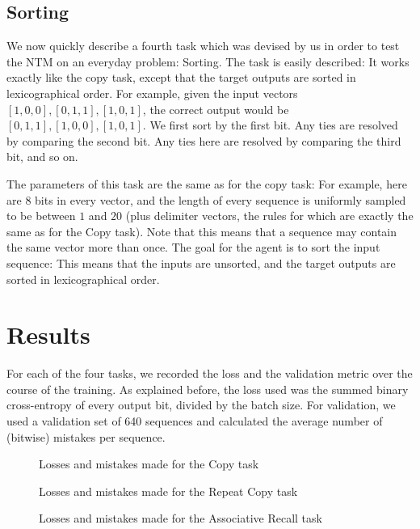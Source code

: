 \documentclass[12pt,twoside]{article}
\newcommand{\taskFigure}[1]{{\centering{
\makebox[\textwidth][c]{\texttt{[image: \#1]}}
}}}
\theoremstyle{plain}
\theoremstyle{definition}
\theoremstyle{remark}
\begin{document}
\subsection{Sorting}
We now quickly describe a fourth task which was devised by us in order to test the NTM on an everyday problem: Sorting. The task is easily described: It works exactly like the copy task, except that the target outputs are sorted in lexicographical order. For example, given the input vectors $[1, 0, 0], [0, 1, 1], [1, 0, 1]$, the correct output would be $[0, 1, 1], [1, 0, 0],  [1, 0, 1]$. We first sort by the first bit. Any ties are resolved by comparing the second bit. Any ties here are resolved by comparing the third bit, and so on.

The parameters of this task are the same as for the copy task: For example, here are $8$ bits in every vector, and the length of every sequence is uniformly sampled to be between $1$ and $20$ (plus delimiter vectors, the rules for which are exactly the same as for the Copy task). Note that this means that a sequence may contain the same vector more than once. The goal for the agent is to sort the input sequence: This means that the inputs are unsorted, and the target outputs are sorted in lexicographical order.

\section{Results}
For each of the four tasks, we recorded the loss and the validation metric over the course of the training. As explained before, the loss used was the summed binary cross-entropy of every output bit, divided by the batch size. For validation, we used a validation set of 640 sequences and calculated the average number of (bitwise) mistakes per sequence.

\begin{figure}\label{fig-copy}
\taskFigure{src/copy_task.pdf}
 \caption{Losses and mistakes made for the Copy task}
\end{figure}

\begin{figure}\label{fig-repeat-copy}
\taskFigure{src/repeat_copy_task.pdf}
\caption{Losses and mistakes made for the Repeat Copy task}
\end{figure}

\begin{figure}\label{fig-assoc}
\taskFigure{src/associative_recall_task.pdf}
\caption{Losses and mistakes made for the Associative Recall task}
\end{figure}
\end{document}
